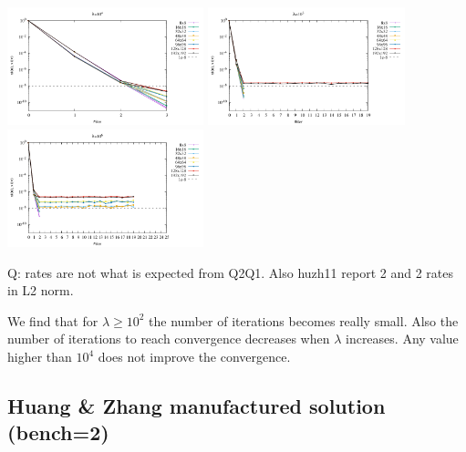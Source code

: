 \begin{center}
\includegraphics[width=5.7cm]{python_codes/fieldstone_161/results/bench1/iterations/conv4.pdf}
\includegraphics[width=5.7cm]{python_codes/fieldstone_161/results/bench1/iterations/conv5.pdf}
\includegraphics[width=5.7cm]{python_codes/fieldstone_161/results/bench1/iterations/conv6.pdf}
\end{center}

Q: rates are not what is expected from Q2Q1. 
Also huzh11 report 2 and 2 rates in L2 norm.

We find that for $\lambda \ge 10^2$ the number of iterations becomes really small.
Also the number of iterations to reach convergence decreases when $\lambda$ increases. 
Any value higher than $10^4$ does not improve the convergence.

\subsection*{Huang \& Zhang manufactured solution (bench=2)}

